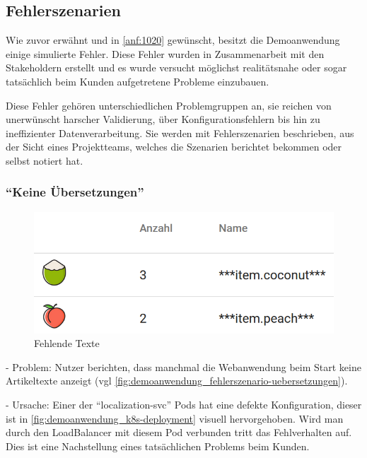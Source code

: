 \subsection{Fehlerszenarien}
\label{subsec:fehlerszenarien}

Wie zuvor erwähnt und in \autoref{anf:1020} gewünscht, besitzt die Demoanwendung einige simulierte Fehler. Diese Fehler wurden in Zusammenarbeit mit den Stakeholdern erstellt und es wurde versucht möglichst realitätsnahe oder sogar tatsächlich beim Kunden aufgetretene Probleme einzubauen.

Diese Fehler gehören unterschiedlichen Problemgruppen an, sie reichen von unerwünscht harscher Validierung, über Konfigurationsfehlern bis hin zu ineffizienter Datenverarbeitung. Sie werden mit Fehlerszenarien beschrieben, aus der Sicht eines Projektteams, welches die Szenarien berichtet bekommen oder selbst notiert hat.

\subsubsection{\enquote{Keine Übersetzungen}}

\begin{figure}
\centering
\vspace{-\baselineskip}
\includegraphics[width=\linewidth]{img/04_erstellung-poc/demoanwendung_fehlerszenario-uebersetzungen}
\caption{Fehlende Texte}
\label{fig:demoanwendung_fehlerszenario-uebersetzungen}
\end{figure}

- Problem: Nutzer berichten, dass manchmal die Webanwendung beim Start keine Artikeltexte anzeigt (vgl \autoref{fig:demoanwendung_fehlerszenario-uebersetzungen}).

- Ursache: Einer der \enquote{localization-svc} Pods hat eine defekte Konfiguration, dieser ist in \autoref{fig:demoanwendung_k8s-deployment} visuell hervorgehoben. Wird man durch den LoadBalancer mit diesem Pod verbunden tritt das Fehlverhalten auf. Dies ist eine Nachstellung eines tatsächlichen Problems beim Kunden.

